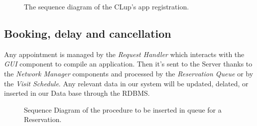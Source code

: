 \begin{figure}[H]
  \label{RegistrationSD}
  \centering
    \caption{The sequence diagram of the CLup's app registration.}
\end{figure} 

\subsection{Booking, delay and cancellation}

Any appointment is managed by the \textit{Request Handler} which interacts with the \textit{GUI} component to compile an application. Then it's sent to the Server thanks to the \textit{Network Manager} components and processed by the \textit{Reservation Queue} or by the \textit{Visit Schedule}. Any relevant data in our system will be updated, delated, or inserted in our Data base through the RDBMS.


\begin{figure}[H]
  \label{ReservatioSD}
  \centering
    \caption{Sequence Diagram of the procedure to be inserted in queue for a Reservation.}
\end{figure} 


